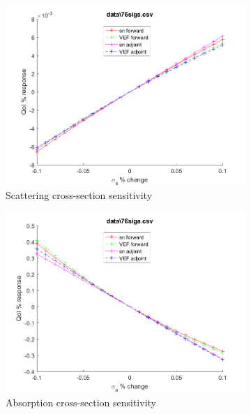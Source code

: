 \documentclass{article}
\begin{document}
\begin{figure}[H]
\begin{subfigure}{.5\textwidth}
  \includegraphics[width=.98\linewidth]{IanProposal/figures2/76sigsSens.png}
  \caption{Scattering cross-section sensitivity}
  \label{fig:sfig2}
\end{subfigure}%
\begin{subfigure}{.5\textwidth}
  \centering
  \includegraphics[width=.98\linewidth]{IanProposal/figures2/76sigaSens.png}
  \caption{Absorption cross-section sensitivity}
  \label{fig:sfig5}
\end{subfigure}%
\caption{}
\label{fig:fig}
\end{figure}
\newpage

\end{document}
